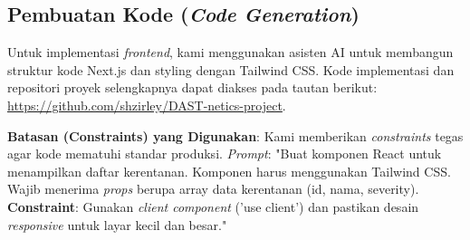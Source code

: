 \documentclass[11pt,bahasa]{article}
\begin{document}
\subsection{Pembuatan Kode (\textit{Code Generation})}
Untuk implementasi \textit{frontend}, kami menggunakan asisten AI untuk membangun struktur kode Next.js dan styling dengan Tailwind CSS. Kode implementasi dan repositori proyek selengkapnya dapat diakses pada tautan berikut: \url{https://github.com/shzirley/DAST-netics-project}.

\textbf{Batasan (Constraints) yang Digunakan}: Kami memberikan \textit{constraints} tegas agar kode mematuhi standar produksi.
\textit{Prompt}: "Buat komponen React untuk menampilkan daftar kerentanan. Komponen harus menggunakan Tailwind CSS. Wajib menerima \textit{props} berupa array data kerentanan (id, nama, severity). \textbf{Constraint}: Gunakan \textit{client component} ('use client') dan pastikan desain \textit{responsive} untuk layar kecil dan besar."
\end{document}
